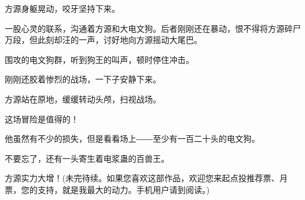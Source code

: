 \begin{this_body}
方源身躯晃动，咬牙坚持下来。

一股心灵的联系，沟通着方源和大电文狗。后者刚刚还在暴动，恨不得将方源碎尸万段，但此刻却汪的一声，讨好地向方源摇动大尾巴。

围攻的电文狗群，听到狗王的叫声，顿时停住冲击。

刚刚还胶着惨烈的战场，一下子安静下来。

方源站在原地，缓缓转动头颅，扫视战场。

这场冒险是值得的！

他虽然有不少的损失，但是看看场上――至少有一百二十头的电文狗。

不要忘了，还有一头寄生着电浆蛊的百兽王。

方源实力大增！(未完待续。如果您喜欢这部作品，欢迎您来起点投推荐票、月票，您的支持，就是我最大的动力。手机用户请到阅读。)

\end{this_body}

